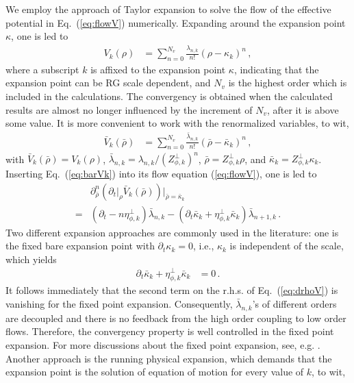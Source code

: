 \documentclass[%
reprint,
superscriptaddress,
showpacs,preprintnumbers,
 amsmath,amssymb,
 aps,
prd,
]{revtex4-1}
\def\Eq#1{Eq.~(\ref{#1})}
\begin{document}
We employ the approach of Taylor expansion to solve the flow of the effective potential in \Eq{eq:flowV} numerically. Expanding around the expansion point $\kappa$, one is led to 
\begin{align}\label{}
  V_k(\rho)&=\sum^{N_v}_{n=0}\frac{\lambda_{n,k}}{n!}(\rho-\kappa_k)^n\,,\label{}
\end{align}
where a subscript $k$ is affixed to the expansion point $\kappa$, indicating that the expansion point can be RG scale dependent, and $N_v$ is the highest order which is included in the calculations. The convergency is obtained when the calculated results are almost no longer influenced by the increment of $N_v$, after it is above some value. It is more convenient to work with the renormalized variables, to wit,
\begin{align}
  \bar V_k(\bar \rho)&=\sum^{N_v}_{n=0}\frac{\bar \lambda_{n,k}}{n!}(\bar \rho-\bar \kappa_k)^n\,,\label{eq:barVk}
\end{align}
with $\bar V_k(\bar \rho)=V_k(\rho)$, $\bar \lambda_{n,k}=\lambda_{n,k}/(Z^{\perp}_{\phi,k})^n$, $\bar \rho=Z^{\perp}_{\phi,k} \rho$, and $\bar \kappa_k=Z^{\perp}_{\phi,k}\kappa_k$. Inserting \Eq{eq:barVk} into its flow equation (\ref{eq:flowV}), one is led to
\begin{align}
  &\partial^n_{\bar \rho}\left(\partial_t\big|_{\rho} \bar V_k(\bar \rho)\right)\Big|_{\bar \rho=\bar \kappa_k}\nonumber\\[2ex]
=&(\partial_t -n\eta_{\phi,k}^{\perp})\bar{\lambda}_{n,k}-(\partial_t \bar \kappa_k+\eta_{\phi,k}^{\perp}\bar \kappa_k)\bar \lambda_{n+1,k}\,.\label{eq:drhoV}
\end{align}
Two different expansion approaches are commonly used in the literature: one is the fixed bare expansion point with $\partial_t \kappa_k=0$, i.e., $\kappa_k$ is independent of the scale, which yields 
\begin{align}
  \partial_t \bar \kappa_k+\eta_{\phi,k}^{\perp}\bar \kappa_k&=0\,.\label{eq:dtkappafix}
\end{align}
It follows immediately that the second term on the r.h.s. of \Eq{eq:drhoV} is vanishing for the fixed point expansion. Consequently, $\bar \lambda_{n,k}$'s of different orders are decoupled and there is no feedback from the high order coupling to low order flows. Therefore,  the convergency property is well controlled in the fixed point expansion. For more discussions about the fixed point expansion, see, e.g. \cite{Pawlowski:2014zaa}. Another approach is the running physical expansion, which demands that the expansion point is the solution of equation of motion for every value of $k$, to wit,
\end{document}
